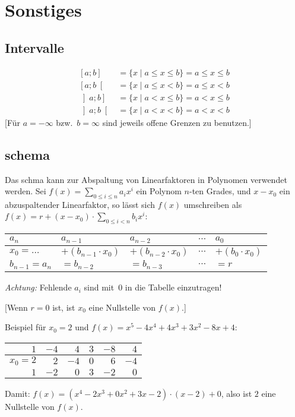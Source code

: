 \chapter{Sonstiges}

\section{\label{sec:intervalle}Intervalle}

\begin{align*}
  \left[a;b\right]   & =\{ x\mid a\leq x\leq b\} =a\leq x\leq b\\
  \left[a;b\right[   & =\{ x\mid a\leq x<b\}     =a\leq x<b\\
  \left]a;b\right]   & =\{ x\mid a<x\leq b\}     =a<x\leq b\\
  \left]a;b\right[   & =\{ x\mid a<x<b\}         =a<x<b
\end{align*}
[Für $a=-\infty$ bzw.~$b=\infty$ sind jeweils offene Grenzen zu benutzen.]


\section{\label{hornerschema}schema}
Das schma kann zur Abspaltung von Linearfaktoren in Polynomen verwendet werden.
Sei $f(x)=\sum_{0 \leq i \leq n} a_i x^i$ ein Polynom $n$-ten Grades, und $x-x_0$ ein abzuspaltender Linearfaktor, so lässt sich $f(x)$ umschreiben als $f(x)=r+(x-x_0)\cdot\sum_{0 \leq i < n} b_i x^i$:

\noindent\begin{center}
\begin{tabular}{l|l|l|l|l}
	$a_n$         & $a_{n-1}$              & $a_{n-2}$              & $\cdots$ & $a_0$                \\ \hline
	$x_0=\ldots$  & $+(b_{n-1} \cdot x_0)$ & $+(b_{n-2} \cdot x_0)$ & $\cdots$ & $+(b_{0} \cdot x_0)$ \\
	$b_{n-1}=a_n$ & $=b_{n-2}$             & $=b_{n-3}$             & $\cdots$ & $=r$
\end{tabular}
\end{center}

\emph{Achtung:} Fehlende $a_i$ sind mit~$0$ in die Tabelle einzutragen!

[Wenn $r=0$ ist, ist $x_0$ eine Nullstelle von $f(x)$.]

Beispiel für $x_0=2$ und $f(x)=x^5 - 4x^4 + 4x^3 + 3x^2 - 8x + 4$:
\noindent\begin{center}
\begin{tabular}{r|r|r|r|r|r}
	$1$     & $-4$ & $4$  & $3$ & $-8$ & $4$  \\ \hline
	$x_0=2$ & $2$  & $-4$ & $0$ & $6$  & $-4$ \\
	$1$     & $-2$ & $0$  & $3$ & $-2$ & $0$
\end{tabular}
\end{center}
Damit: $f(x) = (x^4 - 2x^3 + 0x^2 + 3x - 2)\cdot(x-2) + 0$, also ist $2$ eine Nullstelle von $f(x)$.


